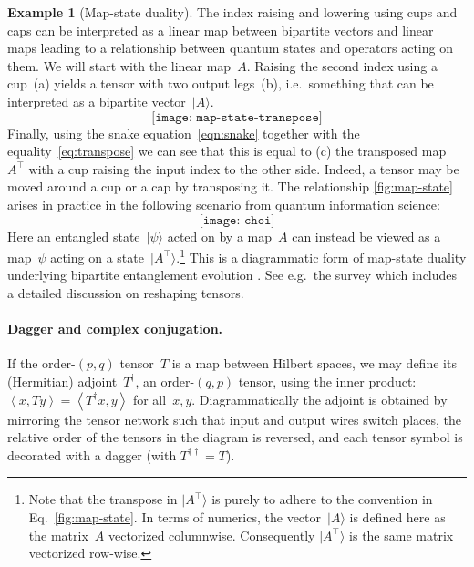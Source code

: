\documentclass[aps,pra,12pt,nofootinbib,superscriptaddress,longbibliography]{revtex4-1}
\theoremstyle{plain}
\theoremstyle{definition}
\newtheorem{example}[theorem]{Example}
\newcommand{\ket}[1]{\mbox{$|#1\rangle$}}
\newcommand{\inprod}[2]{\ensuremath{\left\langle #1, #2 \right\rangle}}
\begin{document}
\begin{example}[Map-state duality]
The index raising and lowering using cups and caps can be interpreted
as a linear map between bipartite vectors and linear maps leading to a relationship between quantum states and operators acting on them.
We will start with the linear map~$A$. Raising the second index using a cup~(a)
yields a tensor with two output legs~(b),
i.e.~something that can be interpreted as a bipartite vector~$\ket{A}$.
\begin{equation}\label{fig:map-state}
\texttt{[image: map-state-transpose]}
\end{equation}
Finally, using the snake equation~\eqref{eqn:snake}
together with the equality~\eqref{eq:transpose}
we can see that this is equal to (c) the transposed map~$A^\top$
with a cup raising the input index to the other side.
Indeed, a tensor may be moved around a cup or a cap by transposing it.
The relationship \eqref{fig:map-state}
arises in practice in the following scenario from quantum information science:
\begin{equation}\label{fig:choi}
 \texttt{[image: choi]} 
\end{equation}
Here an entangled state~$\ket{\psi}$ acted on by a map~$A$ can instead be viewed as a map~$\psi$ acting on a state~$\ket{A^\top}$.\footnote{
Note that the transpose in $\ket{A^\top}$ is purely to adhere to the convention in Eq.~\eqref{fig:map-state}.
In terms of numerics, the vector~$\ket{A}$ is defined here as the matrix~$A$ vectorized columnwise.
Consequently $\ket{A^\top}$ is the same matrix vectorized row-wise.}
This is a diagrammatic form of map-state duality underlying bipartite entanglement evolution \cite{Wood:2015:TNG:2871422.2871425,MB12}.  See e.g.~the survey \cite{MAL-059} which includes a detailed discussion on reshaping tensors.  
\end{example}


\paragraph{{\bf Dagger and complex conjugation.}}
\label{par:dagger}

If the order-$(p,q)$ tensor~$T$ is a map between Hilbert spaces, we may define its (Hermitian) adjoint~$T^\dagger$, an order-$(q,p)$ tensor, using the inner product:
$\inprod{x}{Ty} = \inprod{T^\dagger x}{y}$ for all~$x,y$.
Diagrammatically the adjoint is obtained by mirroring the tensor network such that input and output wires switch places,
the relative order of the tensors in the diagram is reversed, and each tensor symbol is decorated with a dagger (with $T^{\dagger \dagger} = T$).
\end{document}
